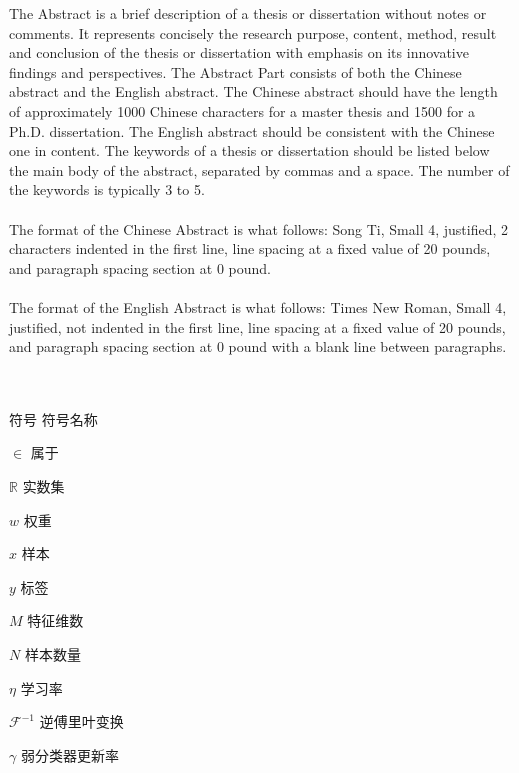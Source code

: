 \begin{englishabstract}
The Abstract is a brief description of a thesis or dissertation without notes or comments. It represents concisely the research purpose, content, method, result and conclusion of the thesis or dissertation with emphasis on its innovative findings and perspectives. The Abstract Part consists of both the Chinese abstract and the English abstract. The Chinese abstract should have the length of approximately 1000 Chinese characters for a master thesis and 1500 for a Ph.D. dissertation. The English abstract should be consistent with the Chinese one in content. The keywords of a thesis or dissertation should be listed below the main body of the abstract, separated by commas and a space. The number of the keywords is typically 3 to 5.
\\~\\
The format of the Chinese Abstract is what follows: Song Ti, Small 4, justified, 2 characters indented in the first line, line spacing at a fixed value of 20 pounds, and paragraph spacing section at 0 pound.
\\~\\
The format of the English Abstract is what follows: Times New Roman, Small 4, justified, not indented in the first line, line spacing at a fixed value of 20 pounds, and paragraph spacing section at 0 pound with a blank line between paragraphs.
~\\
 \\

\end{englishabstract}


\XDUpremainmatter

\begin{symbollist}
\item [符号] \hspace{12em} {符号名称}
\item [$\in$]\hspace{12.5em} {属于}
\item [$\mathbb{R}$]\hspace{12.5em} {实数集}
\item [$w$] \hspace{12.5em} {权重}
\item [$x$] \hspace{12.5em} {样本}
\item [$y$] \hspace{12.5em} {标签}
\item [$M$] \hspace{12.5em} {特征维数}
\item [$N$] \hspace{12.5em} {样本数量}
\item [$\eta$] \hspace{12.5em} {学习率}
\item [$\mathcal{F}^{-1}$] \hspace{12.5em} {逆傅里叶变换}
\item [$\gamma$] \hspace{12.5em} {弱分类器更新率}
\end{symbollist}

